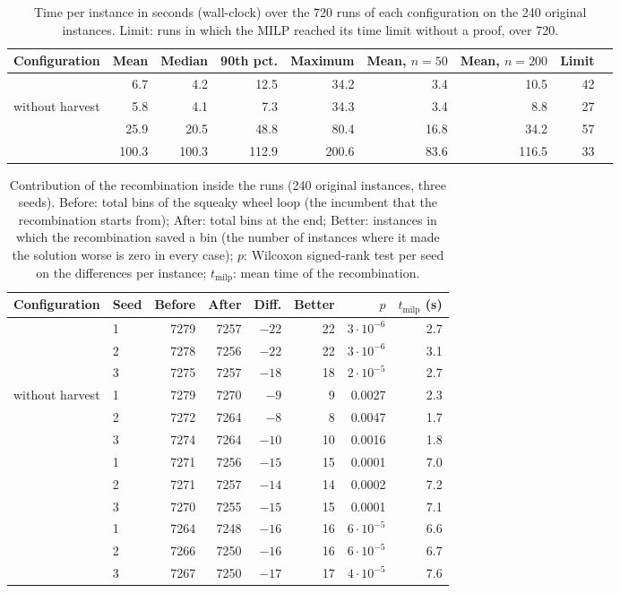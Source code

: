 \begin{table}[t]
\centering
\small\setlength{\tabcolsep}{4pt}
\caption{Time per instance in seconds (wall-clock) over the 720 runs of each configuration on the 240 original instances. Limit: runs in which the MILP reached its time limit without a proof, over 720.}
\label{tab:e-time}
\begin{tabular}{@{}lrrrrrrrr@{}}
\toprule
Configuration & Mean & Median & 90th pct. & Maximum & Mean, $n=50$ & Mean, $n=200$ & Limit\\
\midrule
\cfgfast{} & 6.7 & 4.2 & 12.5 & 34.2 & 3.4 & 10.5 & 42\\
\cfgfast{} without harvest & 5.8 & 4.1 & 7.3 & 34.3 & 3.4 & 8.8 & 27\\
\cfgbal{} & 25.9 & 20.5 & 48.8 & 80.4 & 16.8 & 34.2 & 57\\
\cfgqual{} & 100.3 & 100.3 & 112.9 & 200.6 & 83.6 & 116.5 & 33\\
\bottomrule
\end{tabular}
\end{table}

\begin{table}[t]
\centering
\small\setlength{\tabcolsep}{4pt}
\caption{Contribution of the recombination inside the runs (240 original instances, three seeds). Before: total bins of the squeaky wheel loop (the incumbent that the
recombination starts from); After: total bins at the end; Better: instances in which the recombination saved a bin (the number of instances where it made the solution worse is zero in every case);
$p$: Wilcoxon signed-rank test per seed on the differences per instance; $t_{\mathrm{milp}}$: mean time of the recombination.}
\label{tab:e-within}
\begin{tabular}{@{}llrrrrrr@{}}
\toprule
Configuration & Seed & Before & After & Diff. & Better & $p$ & $t_{\mathrm{milp}}$ (s)\\
\midrule
\cfgfast{} & 1 & 7279 & 7257 & $-22$ & 22 & $3\cdot 10^{-6}$ & 2.7\\
 & 2 & 7278 & 7256 & $-22$ & 22 & $3\cdot 10^{-6}$ & 3.1\\
 & 3 & 7275 & 7257 & $-18$ & 18 & $2\cdot 10^{-5}$ & 2.7\\
\cfgfast{} without harvest & 1 & 7279 & 7270 & $-9$ & 9 & 0.0027 & 2.3\\
 & 2 & 7272 & 7264 & $-8$ & 8 & 0.0047 & 1.7\\
 & 3 & 7274 & 7264 & $-10$ & 10 & 0.0016 & 1.8\\
\cfgbal{} & 1 & 7271 & 7256 & $-15$ & 15 & 0.0001 & 7.0\\
 & 2 & 7271 & 7257 & $-14$ & 14 & 0.0002 & 7.2\\
 & 3 & 7270 & 7255 & $-15$ & 15 & 0.0001 & 7.1\\
\cfgqual{} & 1 & 7264 & 7248 & $-16$ & 16 & $6\cdot 10^{-5}$ & 6.6\\
 & 2 & 7266 & 7250 & $-16$ & 16 & $6\cdot 10^{-5}$ & 6.7\\
 & 3 & 7267 & 7250 & $-17$ & 17 & $4\cdot 10^{-5}$ & 7.6\\
\bottomrule
\end{tabular}
\end{table}


